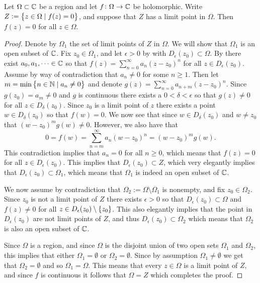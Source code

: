 \documentclass[11pt,a4paper]{article}
\begin{document}
\begin{theorem}
  \label{thm:zeros-have-limit-implies-f-is-zero}
  Let $\Omega \subset \mathbb{C}$ be a region and let $f \colon \Omega \to \mathbb{C}$
  be holomorphic.
  Write $Z := \left\{z \in \Omega \mid f(z) = 0\right\}$,
  and suppose that $Z$ has a limit point in $\Omega$.
  Then $f(z) = 0$ for all $z \in \Omega$.
\end{theorem}
\begin{proof}
  Denote by $\Omega_1$ the set of limit points of $Z$ in $\Omega$.
  We will show that $\Omega_1$ is an open subset of $\mathbb{C}$.
  Fix $z_0 \in \Omega_1$, and let $\epsilon > 0$ by with
  $D_{\epsilon}(z_0) \subset \Omega$.
  By  there exist
  $a_0,a_1,\dots \in \mathbb{C}$ so that $f(z) = \sum_{n=0}^{\infty} a_n (z - z_0)^n$
  for all $z \in D_{\epsilon}(z_0)$.
  Assume by way of contradiction that $a_n \neq 0$ for some $n \geq 1$.
  Then let $m = \min\left\{n \in \mathbb{N} \mid a_n \neq 0\right\}$ and denote
  $g(z) = \sum_{n=0}^{\infty} a_{n+m} (z - z_0)^n$.
  Since $g(z_0) = a_m \neq 0$ and $g$ is continuous there exists a
  $0 < \delta < \epsilon$ so that $g(z) \neq 0$ for all $z \in D_{\delta}(z_0)$.
  Since $z_0$ is a limit point of $z$ there exists a point
  $w \in D_{\delta}(z_0)$ so that $f(w) = 0$.
  We now see that since $w \in D_{\delta}(z_0)$ and $w \neq z_0$ that
  $(w - z_0)^m g(w) \neq 0$.
  However, we also have that
  \[
    0 = f(w) =
    \sum_{n=m}^{\infty} a_n (w - z_0)^n =
    (w - z_0)^m g(w).
  \]
  This contradiction implies that $a_n = 0$ for all $n \geq 0$,
  which means that $f(z) = 0$ for all $z \in D_{\epsilon}(z_0)$.
  This implies that $D_{\epsilon}(z_0) \subset Z$,
  which very elegantly implies that $D_{\epsilon}(z_0) \subset \Omega_1$,
  which means that $\Omega_1$ is indeed an open subset of $\mathbb{C}$.

  We now assume by contradiction that $\Omega_2 := \Omega \setminus \Omega_1$
  is nonempty, and fix $z_0 \in \Omega_2$.
  Since $z_0$ is not a limit point of $Z$ there exists $\epsilon > 0$
  so that $D_{\epsilon}(z_0) \subset \Omega$ and $f(z) \neq 0$ for all
  $z \in D_{\epsilon}(z_0) \setminus \left\{z_0\right\}$.
  This also elegantly implies that the point in $D_{\epsilon}(z_0)$ are not
  limit points of $Z$, and thus $D_{\epsilon}(z_0) \subset \Omega_2$
  which means that $\Omega_2$ is also an open subset of $\mathbb{C}$.

  Since $\Omega$ is a region, and since $\Omega$ is the disjoint union
  of two open sets $\Omega_1$ and $\Omega_2$,
  this implies that either $\Omega_1 = \emptyset$ or $\Omega_2 = \emptyset$.
  Since by assumption $\Omega_1 \neq \emptyset$ we get that
  $\Omega_2 = \emptyset$ and so $\Omega_1 = \Omega$.
  This means that every $z \in \Omega$ is a limit point of $Z$,
  and since $f$ is continuous it follows that $\Omega = Z$ which completes
  the proof.
\end{proof}
\end{document}
